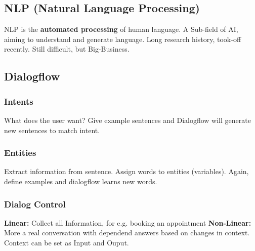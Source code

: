 \subsection{NLP (Natural Language Processing)}
NLP is the \textbf{automated processing} of human language.
A Sub-field of AI, aiming to understand and generate language.
Long research history, took-off recently.
Still difficult, but Big-Business.
\subsection{Dialogflow}
\subsubsection{Intents}
What does the user want?
Give example sentences and Dialogflow will generate new sentences to match intent.

\subsubsection{Entities}
Extract information from sentence.
Assign words to entities (variables).
Again, define examples and dialogflow learns new words.

\subsubsection{Dialog Control}
\textbf{Linear:} Collect all Information, for e.g. booking an appointment
\textbf{Non-Linear:} More a real conversation with dependend answers based on changes in context.
Context can be set as Input and Ouput.
